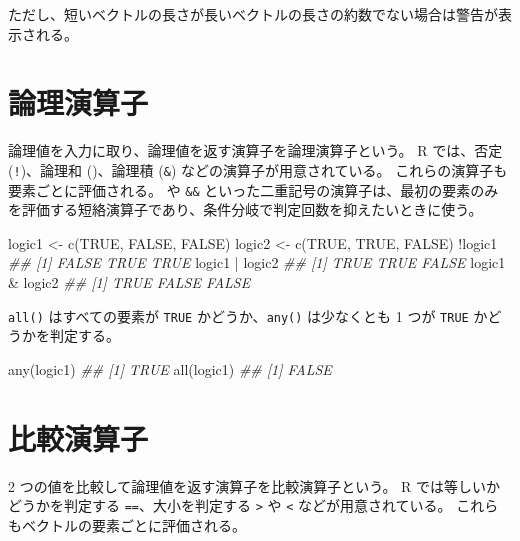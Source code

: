 \documentclass[
  letterpaper,
  xelatex,
  ja=standard, xelatex]{bxjsbook}
\newenvironment{Shaded}{\begin{snugshade}}{\end{snugshade}}
\newcommand{\ConstantTok}[1]{\textcolor[rgb]{0.56,0.35,0.01}{#1}}
\newcommand{\DocumentationTok}[1]{\textcolor[rgb]{0.37,0.37,0.37}{\textit{#1}}}
\newcommand{\FunctionTok}[1]{\textcolor[rgb]{0.28,0.35,0.67}{#1}}
\newcommand{\NormalTok}[1]{\textcolor[rgb]{0.00,0.23,0.31}{#1}}
\newcommand{\OtherTok}[1]{\textcolor[rgb]{0.00,0.23,0.31}{#1}}
\newcommand{\SpecialCharTok}[1]{\textcolor[rgb]{0.37,0.37,0.37}{#1}}
\begin{document}
ただし、短いベクトルの長さが長いベクトルの長さの約数でない場合は警告が表示される。

\section{論理演算子}\label{ux8ad6ux7406ux6f14ux7b97ux5b50}

論理値を入力に取り、論理値を返す演算子を論理演算子という。 R では、否定
(\texttt{!})、論理和 (\texttt{\textbar{}})、論理積 (\texttt{\&})
などの演算子が用意されている。 これらの演算子も要素ごとに評価される。
\texttt{\textbar{}\textbar{}} や \texttt{\&\&}
といった二重記号の演算子は、最初の要素のみを評価する短絡演算子であり、条件分岐で判定回数を抑えたいときに使う。

\begin{Shaded}
\begin{Highlighting}[]
\NormalTok{logic1 }\OtherTok{\textless{}{-}} \FunctionTok{c}\NormalTok{(}\ConstantTok{TRUE}\NormalTok{, }\ConstantTok{FALSE}\NormalTok{, }\ConstantTok{FALSE}\NormalTok{)}
\NormalTok{logic2 }\OtherTok{\textless{}{-}} \FunctionTok{c}\NormalTok{(}\ConstantTok{TRUE}\NormalTok{, }\ConstantTok{TRUE}\NormalTok{, }\ConstantTok{FALSE}\NormalTok{)}
\SpecialCharTok{!}\NormalTok{logic1}
\DocumentationTok{\#\# [1] FALSE  TRUE  TRUE}
\NormalTok{logic1 }\SpecialCharTok{|}\NormalTok{ logic2}
\DocumentationTok{\#\# [1]  TRUE  TRUE FALSE}
\NormalTok{logic1 }\SpecialCharTok{\&}\NormalTok{ logic2}
\DocumentationTok{\#\# [1]  TRUE FALSE FALSE}
\end{Highlighting}
\end{Shaded}

\texttt{all()} はすべての要素が \texttt{TRUE} かどうか、\texttt{any()}
は少なくとも 1 つが \texttt{TRUE} かどうかを判定する。

\begin{Shaded}
\begin{Highlighting}[]
\FunctionTok{any}\NormalTok{(logic1)}
\DocumentationTok{\#\# [1] TRUE}
\FunctionTok{all}\NormalTok{(logic1)}
\DocumentationTok{\#\# [1] FALSE}
\end{Highlighting}
\end{Shaded}

\section{比較演算子}\label{ux6bd4ux8f03ux6f14ux7b97ux5b50}

2 つの値を比較して論理値を返す演算子を比較演算子という。 R
では等しいかどうかを判定する \texttt{==}、大小を判定する
\texttt{\textgreater{}} や \texttt{\textless{}} などが用意されている。
これらもベクトルの要素ごとに評価される。
\end{document}
